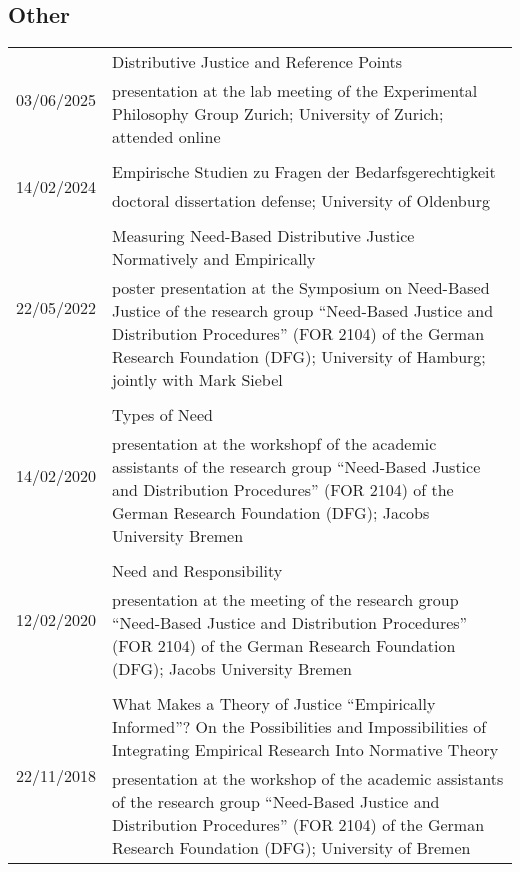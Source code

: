 \documentclass[a4paper,10pt]{article}
\begin{document}
\subsection*{Other}
\begin{longtable}{p{2.25cm}p{11cm}}
\multirow{2}{2.25cm}{\footnotesize{03/06/2025}} & Distributive Justice and Reference Points\\
& \footnotesize{presentation at the lab meeting of the Experimental Philosophy Group Zurich; University of Zurich; attended online}\\
\\
\multirow{2}{2.25cm}{\footnotesize{14/02/2024}} & Empirische Studien zu Fragen der Bedarfsgerechtigkeit\\
& \footnotesize{doctoral dissertation defense; University of Oldenburg}\\
\\
\multirow{2}{2.25cm}{\footnotesize{22/05/2022}} & Measuring Need-Based Distributive Justice Normatively and Empirically\\
& \footnotesize{poster presentation at the Symposium on Need-Based Justice of the research group \enquote{Need-Based Justice and Distribution Procedures} (FOR 2104) of the German Research Foundation (DFG); University of Hamburg; jointly with Mark Siebel}\\
\\
\multirow{2}{2.25cm}{\footnotesize{14/02/2020}} & Types of Need\\
& \footnotesize{presentation at the workshopf of the academic assistants of the research group \enquote{Need-Based Justice and Distribution Procedures} (FOR 2104) of the German Research Foundation (DFG); Jacobs University Bremen}\\
\\
\multirow{2}{2.25cm}{\footnotesize{12/02/2020}} & Need and Responsibility\\
& \footnotesize{presentation at the meeting of the research group \enquote{Need-Based Justice and Distribution Procedures} (FOR 2104) of the German Research Foundation (DFG); Jacobs University Bremen}\\
\\
\multirow{2}{2.25cm}{\footnotesize{22/11/2018}} & What Makes a Theory of Justice \enquote{Empirically Informed}? On the Possibilities and Impossibilities of Integrating Empirical Research Into Normative Theory\\
& \footnotesize{presentation at the workshop of the academic assistants of the research group \enquote{Need-Based Justice and Distribution Procedures} (FOR 2104) of the German Research Foundation (DFG); University of Bremen}\\

\end{longtable}
\end{document}
